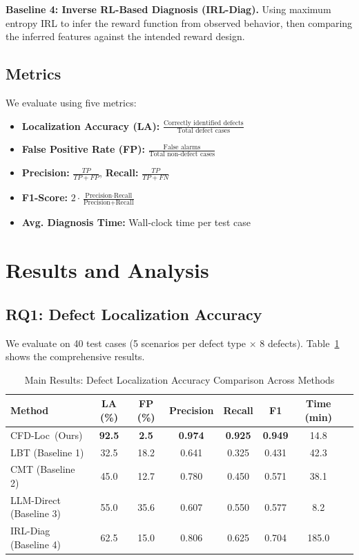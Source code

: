 \documentclass[conference]{IEEEtran}
\theoremstyle{plain}
\newcommand{\methodname}{CFD-Loc}
\begin{document}
\textbf{Baseline 4: Inverse RL-Based Diagnosis (IRL-Diag).} Using maximum entropy IRL to infer the reward function from observed behavior, then comparing the inferred features against the intended reward design.

\subsection{Metrics}

We evaluate using five metrics:

\begin{itemize}[nosep]
    \item \textbf{Localization Accuracy (LA):} $\frac{\text{Correctly identified defects}}{\text{Total defect cases}}$
    \item \textbf{False Positive Rate (FP):} $\frac{\text{False alarms}}{\text{Total non-defect cases}}$
    \item \textbf{Precision:} $\frac{TP}{TP + FP}$, \textbf{Recall:} $\frac{TP}{TP + FN}$
    \item \textbf{F1-Score:} $2 \cdot \frac{\text{Precision} \cdot \text{Recall}}{\text{Precision} + \text{Recall}}$
    \item \textbf{Avg. Diagnosis Time:} Wall-clock time per test case
\end{itemize}

\section{Results and Analysis}
\label{sec:results}

\subsection{RQ1: Defect Localization Accuracy}

We evaluate on 40 test cases (5 scenarios per defect type $\times$ 8 defects). Table~\ref{tab:main_results} shows the comprehensive results.

\begin{table}[t]
\centering
\caption{Main Results: Defect Localization Accuracy Comparison Across Methods}
\label{tab:main_results}
\small
\begin{tabular}{lccccccc}
\toprule
\textbf{Method} & \textbf{LA (\%)} & \textbf{FP (\%)} & \textbf{Precision} & \textbf{Recall} & \textbf{F1} & \textbf{Time (min)} \\
\midrule
\methodname\ (Ours) & \textbf{92.5} & \textbf{2.5} & \textbf{0.974} & \textbf{0.925} & \textbf{0.949} & 14.8 \\
LBT (Baseline 1) & 32.5 & 18.2 & 0.641 & 0.325 & 0.431 & 42.3 \\
CMT (Baseline 2) & 45.0 & 12.7 & 0.780 & 0.450 & 0.571 & 38.1 \\
LLM-Direct (Baseline 3) & 55.0 & 35.6 & 0.607 & 0.550 & 0.577 & 8.2 \\
IRL-Diag (Baseline 4) & 62.5 & 15.0 & 0.806 & 0.625 & 0.704 & 185.0 \\
\bottomrule
\end{tabular}
\end{table}
\end{document}
